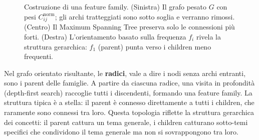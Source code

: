 \begin{figure}[htbp]
    \caption{Costruzione di una feature family. (Sinistra) Il grafo pesato $G$ con pesi $C^{\text{norm}}_{ij}$; gli archi tratteggiati sono sotto soglia e verranno rimossi. (Centro) Il Maximum Spanning Tree preserva solo le connessioni più forti. (Destra) L'orientamento basato sulla frequenza $f_i$ rivela la struttura gerarchica: $f_1$ (parent) punta verso i children meno frequenti.}
    \label{fig:family_construction}
\end{figure}
Nel grafo orientato risultante, le \textbf{radici}, vale a dire i nodi senza archi entranti, sono i parent delle famiglie. A partire da ciascuna radice, una visita in profondità (depth-first search) raccoglie tutti i discendenti, formando una feature family. La struttura tipica è a stella: il parent è connesso direttamente a tutti i children, che raramente sono connessi tra loro. Questa topologia riflette la struttura gerarchica dei concetti: il parent cattura un tema generale, i children catturano sotto-temi specifici che condividono il tema generale ma non si sovrappongono tra loro.
